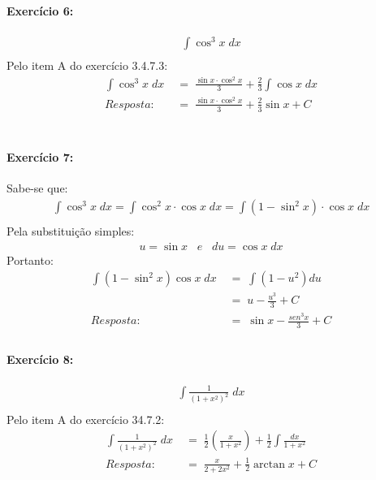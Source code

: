 \documentclass[12pt]{article}
\begin{document}

\paragraph{Exercício 6:}
\begin{align*}
\int \cos^{3}x\; dx\\
\end{align*}
Pelo item A do exercício 3.4.7.3:
\begin{align*}
\int \cos^{3}x\; dx 
&\;=\; \frac{\sin x \cdot \cos^{2} x}{3} + \frac{2}{3} \int \cos x \; dx\\
Resposta: &\;=\; \frac{\sin x \cdot \cos^{2} x}{3} + \frac{2}{3} \sin x + C\\\\\\\\
\end{align*}


\paragraph{Exercício 7:}
Sabe-se que:
\begin{align*}
\int \cos ^{3} x\; dx = \int \cos ^{2}x \cdot \cos x \;dx = \int \left ( 1-\sin ^{2}x \right )\cdot \cos x \;dx\\
\end{align*}
Pela substituição simples:
\begin{align*}
u = \sin x \;\;\; e \;\;\; du = \cos x \;dx
\end{align*}
Portanto:
\begin{align*}
\int \left ( 1-\sin^{2}x \right )\cos x \;dx 
&\;=\; \int \left ( 1- u^{2} \right )du\\
&\;=\; u -\frac{u^{3}}{3} + C\\
Resposta: &\;=\; \sin x - \frac{sen^{3}x}{3} + C\\
\end{align*}


\paragraph{Exercício 8:}
\begin{align*}
\int \frac{1}{\left ( 1+x^{2} \right)^{2}}\; dx\\
\end{align*}
Pelo item A do exercício 34.7.2:
\begin{align*}
\int \frac{1}{\left ( 1+x^{2} \right)^{2}}\; dx 
&\;=\; \frac{1}{2}\left ( \frac{x}{1+x^{2}} \right )+\frac{1}{2}\int \frac{dx}{1+x^{2}}\\
Resposta: &\;=\;\frac{x}{2+2x^{2}}+\frac{1}{2}\arctan x + C\\
\end{align*}
\end{document}
